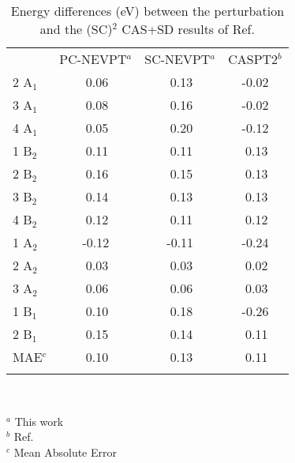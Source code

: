 \documentclass[global,referee]{svjour}
\begin{document}
\begin{table}[h]
\caption{Energy differences (eV) between the perturbation and the (SC)$^2$ CAS+SD results 
of Ref. \cite{Ruiz03}}
\label{Tabforeemaes1}
\begin{tabular}{lccc}
\hline\noalign{\smallskip}
         & PC-NEVPT$^a$& SC-NEVPT$^a$ & CASPT2$^b$    \\
2 A$_1$  & $~$0.06 & $~$0.13  &    -0.02  \\
3 A$_1$  & $~$0.08 & $~$0.16  &    -0.02  \\
4 A$_1$  & $~$0.05 & $~$0.20  &    -0.12  \\
1 B$_2$  & $~$0.11 & $~$0.11  &  $~$0.13  \\
2 B$_2$  & $~$0.16 & $~$0.15  &  $~$0.13  \\
3 B$_2$  & $~$0.14 & $~$0.13  &  $~$0.13  \\
4 B$_2$  & $~$0.12 & $~$0.11  &  $~$0.12  \\
1 A$_2$  &   -0.12 &   -0.11  &    -0.24  \\
2 A$_2$  & $~$0.03 & $~$0.03  &  $~$0.02  \\
3 A$_2$  & $~$0.06 & $~$0.06  &  $~$0.03  \\
1 B$_1$  & $~$0.10 & $~$0.18  &    -0.26  \\
2 B$_1$  & $~$0.15 & $~$0.14  &  $~$0.11  \\
\noalign{\smallskip}\hline
MAE$^c$      & $~$0.10 & $~$0.13  &  $~$0.11  \\
\noalign{\smallskip}\hline
\end{tabular}\\
{\smallskip}

$^a$ This work\\
$^b$ Ref. \cite{Merch95}\\
$^c$ Mean Absolute Error
\end{table}
\end{document}
